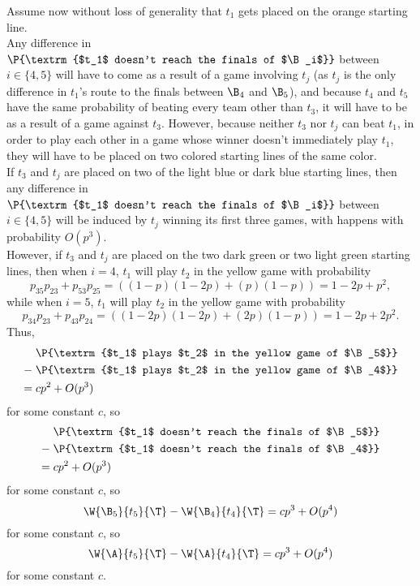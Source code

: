 {{        Assume now without loss of generality that $t_1$ gets placed on the orange starting line.\\

        Any difference in $\P{\textrm{$t_1$ doesn't reach the finals of $\B_i$}}$ between $i \in \{4, 5\}$ will have to come as a result of a game involving $t_j$ (as $t_j$ is the only difference in $t_1$'s route to the finals between $\B_4$ and $\B_5$), and because $t_4$ and $t_5$ have the same probability of beating every team other than $t_3$, it will have to be as a result of a game against $t_3.$ However, because neither $t_3$ nor $t_j$ can beat $t_1$, in order to play each other in a game whose winner doesn't immediately play $t_1$, they will have to be placed on two colored starting lines of the same color.\\

        If $t_3$ and $t_j$ are placed on two of the light blue or dark blue starting lines, then any difference in $\P{\textrm{$t_1$ doesn't reach the finals of $\B_i$}}$ between $i \in \{4, 5\}$ will be induced by $t_j$ winning its first three games, with happens with probability $O(p^3).$\\

        However, if $t_3$ and $t_j$ are placed on the two dark green or two light green starting lines, then when $i = 4$, $t_1$  will play $t_2$ in the yellow game with probability $$p_{35}p_{23} + p_{53}p_{25} = ((1-p)(1-2p) + (p)(1-p)) = 1-2p+p^2,$$ while when $i = 5$, $t_1$ will play $t_2$ in the yellow game with probability $$p_{34}p_{23} + p_{43}p_{24} = ((1-2p)(1-2p) + (2p)(1-p)) = 1-2p+2p^2.$$
        Thus, \begin{align*}
            &\P{\textrm{$t_1$ plays $t_2$ in the yellow game of $\B_5$}}\\
            - \;&\P{\textrm{$t_1$ plays $t_2$ in the yellow game of $\B_4$}}\\
             = \;&cp^2 + O(p^3)
        \end{align*}
        for some constant $c$, so
        \begin{align*}
            &\P{\textrm{$t_1$ doesn't reach the finals of $\B_5$}}\\
            - \;&\P{\textrm{$t_1$ doesn't reach the finals of $\B_4$}}\\
             = \;&cp^2 + O(p^3)
        \end{align*}
        for some constant $c$, so
        $$\W{\B_5}{t_5}{\T} - \W{\B_4}{t_4}{\T} = cp^3 + O(p^4)$$
        for some constant $c$, so
        $$\W{\A}{t_5}{\T} - \W{\A}{t_4}{\T} = cp^3 + O(p^4)$$ for some constant $c.$\\

}}
